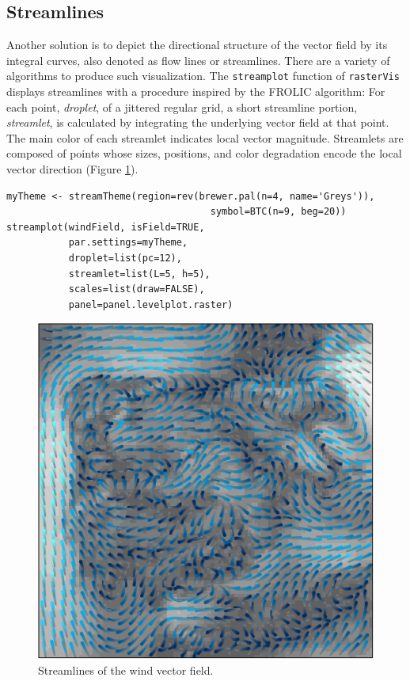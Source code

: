 \documentclass[smallroyalvopaper]{memoir}
\begin{document}
\subsection{Streamlines}
\label{sec-1-2}
Another solution is to depict the directional structure of the vector
field by its integral curves, also denoted as flow lines or
streamlines. There are a variety of algorithms to produce such
visualization. The \texttt{streamplot} function of \texttt{rasterVis} displays
streamlines with a procedure inspired by the FROLIC algorithm: For
each point, \emph{droplet}, of a jittered regular grid, a short streamline
portion, \emph{streamlet}, is calculated by integrating the underlying
vector field at that point. The main color of each streamlet indicates
local vector magnitude. Streamlets are composed of points whose sizes,
positions, and color degradation encode the local vector direction
(Figure \ref{fig:streamplot}).

\lstset{language=R,numbers=none}
\begin{lstlisting}
myTheme <- streamTheme(region=rev(brewer.pal(n=4, name='Greys')),
                                    symbol=BTC(n=9, beg=20))
streamplot(windField, isField=TRUE,
           par.settings=myTheme,
           droplet=list(pc=12),
           streamlet=list(L=5, h=5),
           scales=list(draw=FALSE),
           panel=panel.levelplot.raster)
\end{lstlisting}

\begin{figure}[htb]
\centering
\includegraphics[width=.9\linewidth]{figs/streamplot.pdf}
\caption{\label{fig:streamplot}Streamlines of the wind vector field.}
\end{figure}
\end{document}
